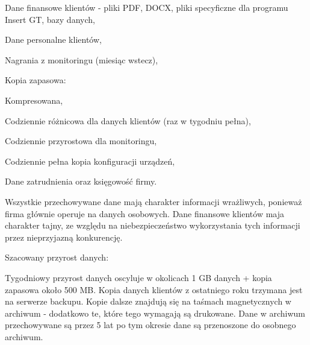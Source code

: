 \hspace{-0.5cm}\begin{minipage}{13.5cm}
	\begin{itemize*}
		\item Dane finansowe klientów - pliki PDF, DOCX, pliki specyficzne dla programu Insert GT, bazy danych,
		\item Dane personalne klientów,
		\item Nagrania z monitoringu (miesiąc wstecz),
		\item Kopia zapasowa:
		\begin{itemize*}
			\item Kompresowana,
			\item Codziennie różnicowa dla danych klientów (raz w tygodniu pełna),
			\item Codziennie przyrostowa dla monitoringu,
			\item Codziennie pełna kopia konfiguracji urządzeń,
		\end{itemize*}
		\item Dane zatrudnienia oraz księgowość firmy.
	\end{itemize*}
\end{minipage}

Wszystkie przechowywane dane mają charakter informacji wrażliwych, ponieważ firma głównie operuje na danych osobowych. Dane finansowe klientów maja charakter tajny, ze względu na niebezpieczeństwo wykorzystania tych informacji przez nieprzyjazną konkurencję.

Szacowany przyrost danych:

Tygodniowy przyrost danych oscyluje w okolicach 1 GB danych + kopia zapasowa około 500 MB. Kopia danych klientów z ostatniego roku trzymana jest na serwerze backupu. Kopie dalsze znajdują się na taśmach magnetycznych w archiwum - dodatkowo te, które tego wymagają są drukowane. Dane w archiwum przechowywane są przez 5 lat po tym okresie dane są przenoszone do osobnego archiwum.
